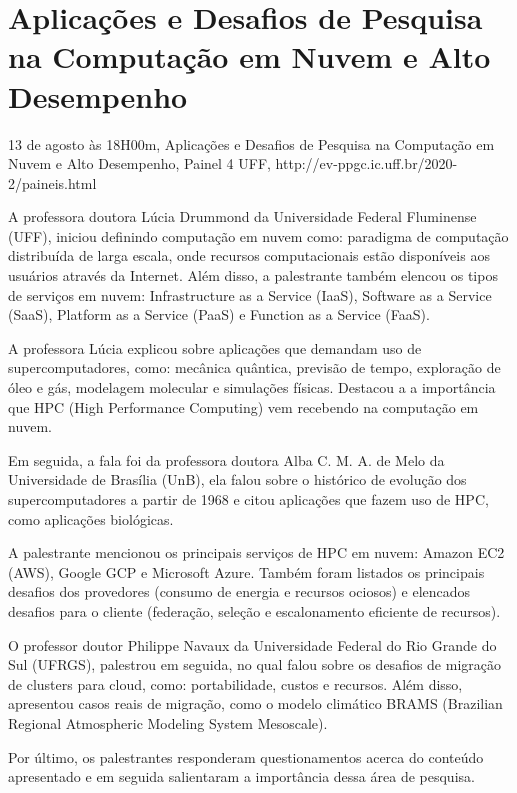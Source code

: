 \section{Aplicações e Desafios de Pesquisa na Computação em Nuvem e Alto Desempenho}

\begin{center}
  \vspace{1cm}
  13 de agosto às 18H00m, Aplicações e Desafios de Pesquisa na Computação em Nuvem e Alto Desempenho, Painel 4 UFF, http://ev-ppgc.ic.uff.br/2020-2/paineis.html
  \vspace{1cm}
\end{center}

A professora doutora Lúcia Drummond da Universidade Federal Fluminense (UFF), iniciou definindo computação em nuvem como: paradigma de computação distribuída de larga escala, onde recursos computacionais estão disponíveis aos usuários através da Internet. Além disso, a palestrante também elencou os tipos de serviços em nuvem: Infrastructure as a Service (IaaS), Software as a Service (SaaS), Platform as a Service (PaaS) e Function as a Service (FaaS).

A professora Lúcia explicou sobre aplicações que demandam uso de supercomputadores, como: mecânica quântica, previsão de tempo, exploração de óleo e gás, modelagem molecular e simulações físicas. Destacou a a importância que HPC (High Performance Computing) vem recebendo na computação em nuvem. 

Em seguida, a fala foi da professora doutora Alba C. M. A. de Melo da Universidade de Brasília (UnB), ela falou sobre o histórico de evolução dos supercomputadores a partir de 1968 e citou aplicações que fazem uso de HPC, como aplicações biológicas. 

A palestrante mencionou os principais serviços de HPC em nuvem: Amazon EC2 (AWS), Google GCP e Microsoft Azure. Também foram listados os principais desafios dos provedores (consumo de energia  e recursos ociosos) e elencados desafios para o cliente (federação, seleção e escalonamento eficiente de recursos). 

O professor doutor Philippe Navaux da Universidade Federal do Rio Grande do Sul (UFRGS), palestrou em seguida, no qual falou sobre os desafios de migração de clusters para cloud, como: portabilidade, custos e recursos. Além disso, apresentou casos reais de migração, como o modelo climático BRAMS (Brazilian Regional Atmospheric Modeling System Mesoscale). 

Por último, os palestrantes responderam questionamentos acerca do conteúdo apresentado e em seguida salientaram a importância dessa área de pesquisa. 
